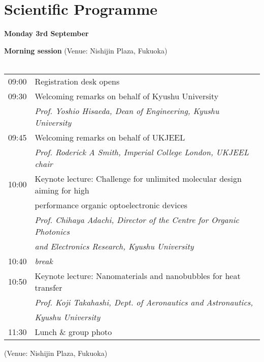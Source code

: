 \section{Scientific Programme}

\begin{center}
{\bf \large Monday 3rd September}
\end{center}
\vspace*{3ex}
{\bf Morning session} (Venue: Nishijin Plaza, Fukuoka)\\


\vspace{1em}
\\
\noindent\begin{tabular}{|l|l|}
    \hline
    09:00   & Registration desk opens \\
    09:30   & Welcoming remarks on behalf of  Kyushu University \\
            & \emph{Prof. Yoshio Hisaeda, Dean of Engineering, Kyushu University} \\
    09:45   & Welcoming remarks on behalf of UKJEEL \\
            & \emph{Prof. Roderick A Smith, Imperial College London, UKJEEL chair} \\
    10:00   & Keynote lecture: Challenge for unlimited molecular design aiming for high\\
            &  \hspace{7.5em} performance organic optoelectronic devices \\
            & \emph{Prof. Chihaya Adachi, Director of the Centre for Organic Photonics}\\
            & \emph{and Electronics Research, Kyushu University} \\
    10:40   & \emph{break} \\
    10:50   & Keynote lecture: Nanomaterials and nanobubbles for heat transfer \\
            & \emph{Prof. Koji Takahashi, Dept. of Aeronautics and Astronautics,} \\
            & \emph{Kyushu University} \\
    11:30   & Lunch \& group photo \\
    \hline
\end{tabular}
\vspace*{3ex}


\newpage
\vspace{-3em}
 (Venue: Nishijin Plaza, Fukuoka)\\
\vspace{1em}

